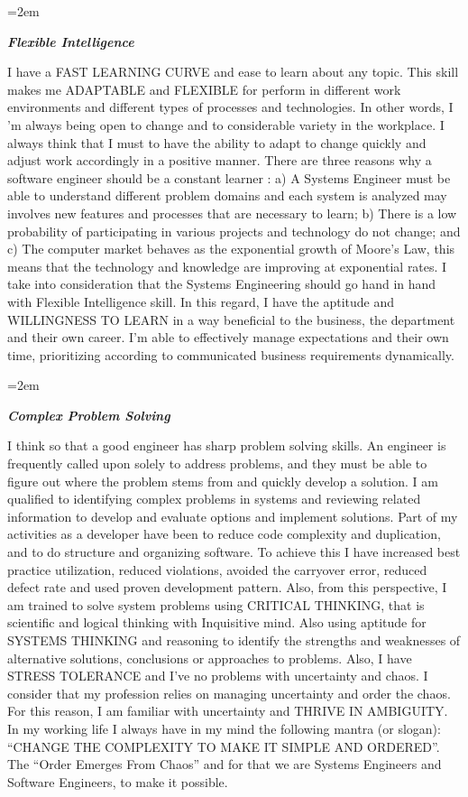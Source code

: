 \documentclass[paper=a4,fontsize=11pt]{scrartcl} %
\newlength{\spacebox}
\newcommand{\sepspace}{\vspace*{1em}}		%
\newcommand{\PersonalEntry}[2]{
		\noindent\hangindent=2em\hangafter=0 %
		\parbox{\spacebox}{        %
		\textit{#1}}		       %
		\hspace{1.5em} #2 \par}    %
\newcommand{\SkillsEntry}[2]{      %
		\noindent\hangindent=2em\hangafter=0 %
		\parbox{\spacebox}{        %
		\textit{#1}}			   %
		\hspace{1.5em} #2 \par}    %
\begin{document}
\SkillsEntry{\large{\textbf{Flexible Intelligence}}}{
I have a FAST LEARNING CURVE and ease to learn about any topic. This skill makes me ADAPTABLE and FLEXIBLE for perform in different work environments and different types of processes and technologies. In other words, I 'm always being open to change and to considerable variety in the workplace. I always think that I must to have the ability to adapt to change quickly and adjust work accordingly in a positive manner. There are three reasons why a software engineer should be a constant learner : a) A Systems Engineer must be able to understand different problem domains and each system is analyzed may involves new features and processes that are necessary to learn;  b) There is a low probability of participating in various projects and technology do not change; and c) The computer market behaves as the exponential growth of Moore's Law, this means that the technology and knowledge are improving at exponential rates. I take into consideration that the Systems Engineering should go hand in hand with Flexible Intelligence skill. In this regard, I have the aptitude and WILLINGNESS TO LEARN in a way beneficial to the business, the department and their own career. I'm able to effectively manage expectations and their own time, prioritizing according to communicated business requirements dynamically. 
}

\sepspace

\SkillsEntry{\large{\textbf{Complex Problem Solving}}}{
I think so that a good engineer has sharp problem solving skills. An engineer is frequently called upon solely to address problems, and they must be able to figure out where the problem stems from and quickly develop a solution. I am qualified to identifying complex problems in systems and reviewing related information to develop and evaluate options and implement solutions. Part of my activities as a developer have been to reduce code complexity and duplication, and to do structure and organizing software. To achieve this I have increased best practice utilization, reduced violations, avoided the carryover error, reduced defect rate and used proven development pattern. Also, from this perspective, I am trained to solve system problems using CRITICAL THINKING, that is scientific and logical thinking with Inquisitive mind. Also using aptitude for SYSTEMS THINKING and reasoning to identify the strengths and weaknesses of alternative solutions, conclusions or approaches to problems. Also, I have STRESS TOLERANCE and I've no problems with uncertainty and chaos. I consider that my profession relies on managing uncertainty and order the chaos. For this reason, I am familiar with uncertainty and THRIVE IN AMBIGUITY. In my working life I always have in my mind the following mantra (or slogan): “CHANGE THE COMPLEXITY TO MAKE IT SIMPLE AND ORDERED”. The “Order Emerges From Chaos” and for that we are Systems Engineers and Software Engineers, to make it possible.
}
\end{document}
